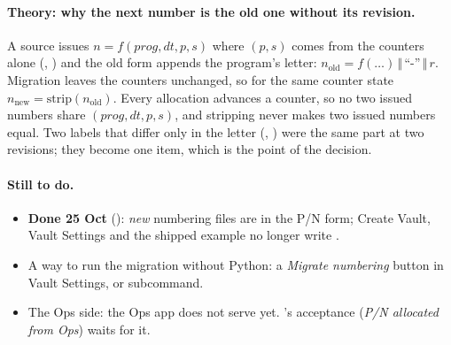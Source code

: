 \paragraph{Theory: why the next number is the old one without its revision.} A source issues
$n = f(\mathit{prog}, \mathit{dt}, p, s)$ where $(p, s)$ comes from the counters alone
(, ) and the old form appends the program's letter: $n_{\mathrm{old}} =
f(\ldots) \,\Vert\, \text{``-''} \,\Vert\, r$. Migration leaves the counters unchanged, so for the same counter state
$n_{\mathrm{new}} = \mathrm{strip}(n_{\mathrm{old}})$. Every allocation advances a counter, so no two issued numbers
share $(\mathit{prog}, \mathit{dt}, p, s)$, and stripping never makes two issued numbers equal. Two labels that differ
only in the letter (, ) were the same part at two revisions; they become one
item, which is the point of the decision.

\paragraph{Still to do.}
\begin{itemize}[nosep]
  \item \textbf{Done 25 Oct} (): \emph{new} numbering files are in the P/N form; Create Vault, Vault Settings
        and the shipped example no longer write .
  \item A way to run the migration without Python: a \emph{Migrate numbering} button in Vault Settings, or
         subcommand.
  \item The Ops side: the Ops app does not serve  yet. 's acceptance (\emph{P/N
        allocated from Ops}) waits for it.
\end{itemize}

